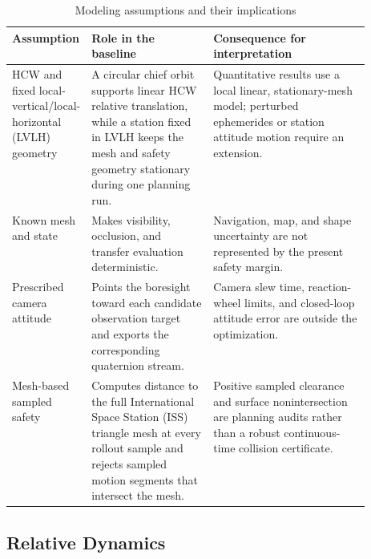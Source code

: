 \documentclass{IEEEtaes}
\begin{document}
\begin{table}[t]
  \centering
  \caption{Modeling assumptions and their implications}
  \label{tab:assumptions}
  \renewcommand{\arraystretch}{1.08}
  \setlength{\tabcolsep}{5pt}
  \footnotesize
  \begin{tabularx}{\linewidth}{@{}p{0.18\linewidth}p{0.34\linewidth}X@{}}
    \toprule
    Assumption & Role in the baseline & Consequence for interpretation \\
    \midrule
    HCW and fixed local-vertical/local-horizontal (LVLH) geometry & A circular chief orbit supports linear HCW relative translation, while a station fixed in LVLH keeps the mesh and safety geometry stationary during one planning run. & Quantitative results use a local linear, stationary-mesh model; perturbed ephemerides or station attitude motion require an extension. \\
    Known mesh and state & Makes visibility, occlusion, and transfer evaluation deterministic. & Navigation, map, and shape uncertainty are not represented by the present safety margin. \\
    Prescribed camera attitude & Points the boresight toward each candidate observation target and exports the corresponding quaternion stream. & Camera slew time, reaction-wheel limits, and closed-loop attitude error are outside the optimization. \\
    Mesh-based sampled safety & Computes distance to the full International Space Station (ISS) triangle mesh at every rollout sample and rejects sampled motion segments that intersect the mesh. & Positive sampled clearance and surface nonintersection are planning audits rather than a robust continuous-time collision certificate. \\
    \bottomrule
  \end{tabularx}
\end{table}

\subsection{Relative Dynamics}
\end{document}
